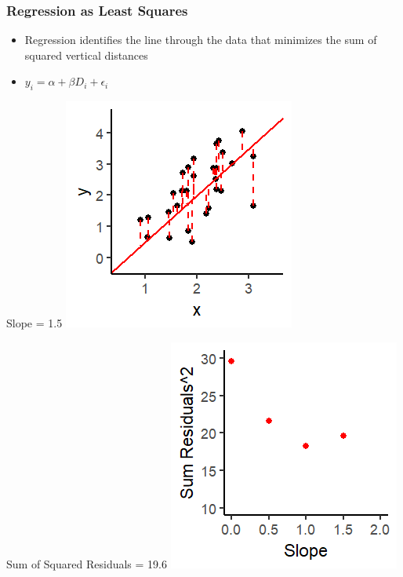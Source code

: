\documentclass[xcolor=x11names,compress]{beamer}\usepackage[]{graphicx}\usepackage[]{color}
\makeatletter
\def\maxwidth{ %
  \ifdim\Gin@nat@width>\linewidth
    \linewidth
  \else
    \Gin@nat@width
  \fi
}
\newenvironment{knitrout}{}{} %
\renewcommand{\(}{\begin{columns}}
\renewcommand{\)}{\end{columns}}
\newcommand{\<}[1]{\begin{column}{#1}}
\renewcommand{\>}{\end{column}}
\makeatother
\begin{document}
\begin{frame}
\frametitle{Regression as Least Squares}
\begin{itemize}
\item Regression identifies the line through the data that minimizes the sum of squared vertical distances 
\item $y_i = \alpha + \beta D_i + \epsilon_i$
\end{itemize}
\begin{multicols}{2}
Slope = 1.5
\begin{knitrout}
\color{fgcolor}
\includegraphics[width=\maxwidth]{figure/graph_ols4-1} 

\end{knitrout}
\columnbreak
Sum of Squared Residuals = 19.6
\begin{knitrout}
\color{fgcolor}
\includegraphics[width=\maxwidth]{figure/graph_ssr4-1} 

\end{knitrout}
\end{multicols}
\end{frame}
\end{document}
